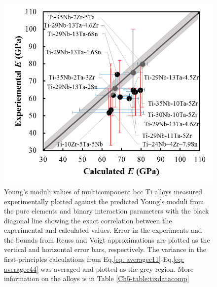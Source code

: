 \pagebreak
\begin{figure}[H]
	\centering
	\includegraphics{Chapter-5/Figures/edatabase.png}
	\caption{Young's moduli values of multicomponent bcc Ti alloys measured experimentally plotted against the predicted Young's moduli from the pure elements and binary interaction parameters with the black diagonal line showing the exact correlation between the experimental and calculated values. Error in the experiments and the bounds from Reuss and Voigt approximations are plotted as the vertical and horizontal error bars, respectively. The variance in the first-principles calculations from Eq.\ref{eq: averagec11}-Eq.\ref{eq: averagec44} was averaged and plotted as the grey region. More information on the alloys is in Table \ref{Ch5-table:tixdatacomp} \cite{Tane2010a,Geetha2009,Mohammed2014}}
	\label{Ch5-figure:tixdatabase}
\end{figure}